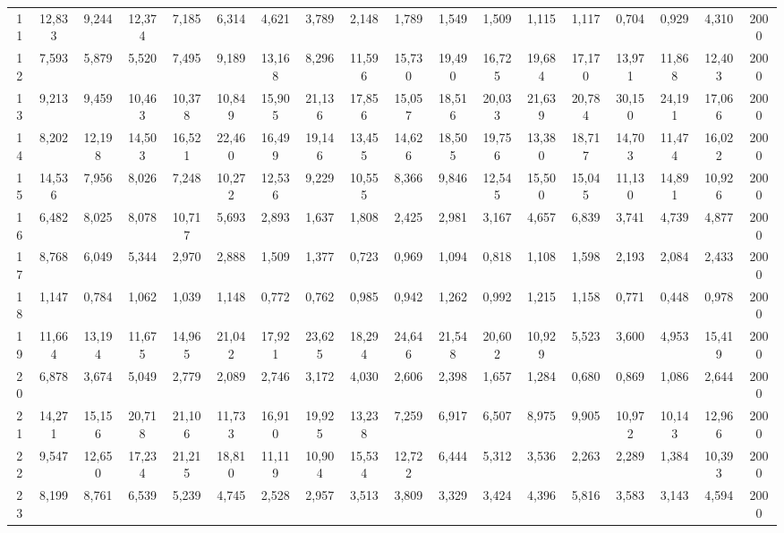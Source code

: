 {\begin{longtable}{ >{\tiny}cccccccccccccccccc}
11  & 12,833 & 9,244  & 12,374 & 7,185  & 6,314  & 4,621  & 3,789  & 2,148  & 1,789  & 1,549  & 1,509  & 1,115  & 1,117   & 0,704   & 0,929   & 4,310  & 2000 \\
12  & 7,593  & 5,879  & 5,520  & 7,495  & 9,189  & 13,168 & 8,296  & 11,596 & 15,730 & 19,490 & 16,725 & 19,684 & 17,170  & 13,971  & 11,868  & 12,403 & 2000 \\
13  & 9,213  & 9,459  & 10,463 & 10,378 & 10,849 & 15,905 & 21,136 & 17,856 & 15,057 & 18,516 & 20,033 & 21,639 & 20,784  & 30,150  & 24,191  & 17,066 & 2000 \\
14  & 8,202  & 12,198 & 14,503 & 16,521 & 22,460 & 16,499 & 19,146 & 13,455 & 14,626 & 18,505 & 19,756 & 13,380 & 18,717  & 14,703  & 11,474  & 16,022 & 2000 \\
15  & 14,536 & 7,956  & 8,026  & 7,248  & 10,272 & 12,536 & 9,229  & 10,555 & 8,366  & 9,846  & 12,545 & 15,500 & 15,045  & 11,130  & 14,891  & 10,926 & 2000 \\
16  & 6,482  & 8,025  & 8,078  & 10,717 & 5,693  & 2,893  & 1,637  & 1,808  & 2,425  & 2,981  & 3,167  & 4,657  & 6,839   & 3,741   & 4,739   & 4,877  & 2000 \\
17  & 8,768  & 6,049  & 5,344  & 2,970  & 2,888  & 1,509  & 1,377  & 0,723  & 0,969  & 1,094  & 0,818  & 1,108  & 1,598   & 2,193   & 2,084   & 2,433  & 2000 \\
18  & 1,147  & 0,784  & 1,062  & 1,039  & 1,148  & 0,772  & 0,762  & 0,985  & 0,942  & 1,262  & 0,992  & 1,215  & 1,158   & 0,771   & 0,448   & 0,978  & 2000 \\
19  & 11,664 & 13,194 & 11,675 & 14,965 & 21,042 & 17,921 & 23,625 & 18,294 & 24,646 & 21,548 & 20,602 & 10,929 & 5,523   & 3,600   & 4,953   & 15,419 & 2000 \\
20  & 6,878  & 3,674  & 5,049  & 2,779  & 2,089  & 2,746  & 3,172  & 4,030  & 2,606  & 2,398  & 1,657  & 1,284  & 0,680   & 0,869   & 1,086   & 2,644  & 2000 \\
21  & 14,271 & 15,156 & 20,718 & 21,106 & 11,733 & 16,910 & 19,925 & 13,238 & 7,259  & 6,917  & 6,507  & 8,975  & 9,905   & 10,972  & 10,143  & 12,966 & 2000 \\
22  & 9,547  & 12,650 & 17,234 & 21,215 & 18,810 & 11,119 & 10,904 & 15,534 & 12,722 & 6,444  & 5,312  & 3,536  & 2,263   & 2,289   & 1,384   & 10,393 & 2000 \\
23  & 8,199  & 8,761  & 6,539  & 5,239  & 4,745  & 2,528  & 2,957  & 3,513  & 3,809  & 3,329  & 3,424  & 4,396  & 5,816   & 3,583   & 3,143   & 4,594  & 2000 \\

\end{longtable}}
